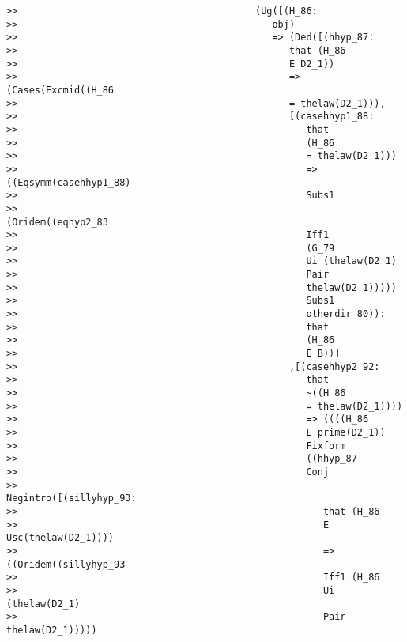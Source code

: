 \documentclass[12pt]{article}
\begin{document}
\begin{verbatim}
>>                                          (Ug([(H_86:
>>                                             obj)
>>                                             => (Ded([(hhyp_87:
>>                                                that (H_86
>>                                                E D2_1))
>>                                                => (Cases(Excmid((H_86
>>                                                = thelaw(D2_1))),
>>                                                [(casehhyp1_88:
>>                                                   that
>>                                                   (H_86
>>                                                   = thelaw(D2_1)))
>>                                                   => ((Eqsymm(casehhyp1_88)
>>                                                   Subs1
>>                                                   (Oridem((eqhyp2_83
>>                                                   Iff1
>>                                                   (G_79
>>                                                   Ui (thelaw(D2_1)
>>                                                   Pair
>>                                                   thelaw(D2_1)))))
>>                                                   Subs1
>>                                                   otherdir_80)):
>>                                                   that
>>                                                   (H_86
>>                                                   E B))]
>>                                                ,[(casehhyp2_92:
>>                                                   that
>>                                                   ~((H_86
>>                                                   = thelaw(D2_1))))
>>                                                   => ((((H_86
>>                                                   E prime(D2_1))
>>                                                   Fixform
>>                                                   ((hhyp_87
>>                                                   Conj
>>                                                   Negintro([(sillyhyp_93:
>>                                                      that (H_86
>>                                                      E Usc(thelaw(D2_1))))
>>                                                      => ((Oridem((sillyhyp_93
>>                                                      Iff1 (H_86
>>                                                      Ui (thelaw(D2_1)
>>                                                      Pair thelaw(D2_1)))))

\end{verbatim}
\end{document}
